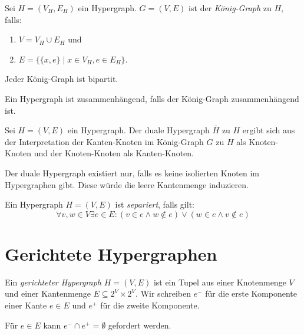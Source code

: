 \begin{definition}
    Sei $ H = (V_H, E_H) $ ein Hypergraph.
    $ G = (V, E) $ ist der \textit{König-Graph} zu $ H $, falls:
    \begin{enumerate}
        \item $ V = V_H \cup E_H $ und
        \item $ E = \{ \{ x, e \} \mid x \in V_H, e \in E_H \} $.
    \end{enumerate}
\end{definition}

\begin{remark}
    Jeder König-Graph ist bipartit.
\end{remark}

\begin{lemma}
    Ein Hypergraph ist zusammenhängend, falls der König-Graph zusammenhängend ist.
\end{lemma}

\begin{definition}
    Sei $ H = (V, E) $ ein Hypergraph.
    Der duale Hypergraph $ \bar H $ zu $ H $ ergibt sich aus der Interpretation der Kanten-Knoten im König-Graph $ G $ zu $ H $ als Knoten-Knoten und der Knoten-Knoten als Kanten-Knoten.
\end{definition}

\begin{remark}
    Der duale Hypergraph existiert nur, falls es keine isolierten Knoten im Hypergraphen gibt.
    Diese würde die leere Kantenmenge induzieren.
\end{remark}

\begin{definition}[Separiert]
    Ein Hypergraph $ H = (V, E) $ ist \textit{separiert}, falls gilt:
    \begin{equation*}
        \forall v, w \in V \exists e \in E: (v \in e \land w \notin e) \lor (w \in e \land v \notin e)
    \end{equation*}
\end{definition}

\section{Gerichtete Hypergraphen}

\begin{definition}
    Ein \textit{gerichteter Hypergraph} $ H = (V, E) $ ist ein Tupel aus einer Knotenmenge $ V $ und einer Kantenmenge $ E \subseteq 2^V \times 2^V $.
    Wir schreiben $ e^- $ für die erste Komponente einer Kante $ e \in E $ und $ e^+ $ für die zweite Komponente.

    Für $ e \in E $ kann $ e^- \cap e^+ = \emptyset $ gefordert werden.
\end{definition}

